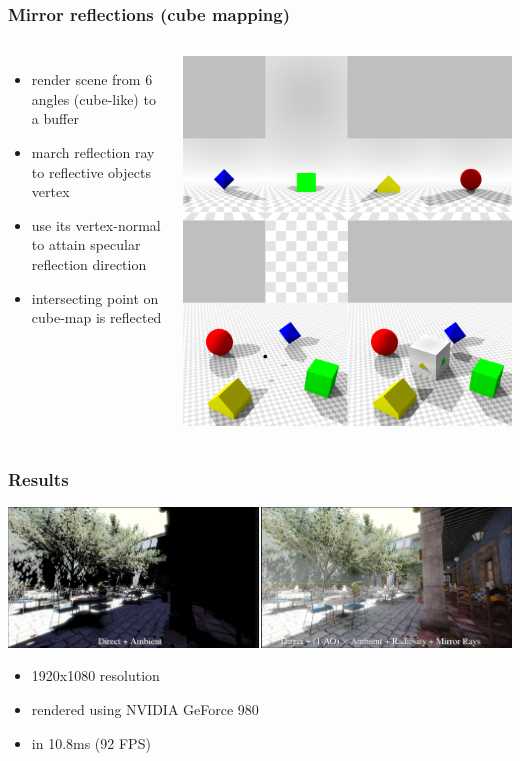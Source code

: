 \documentclass[aspectratio=169]{beamer}
\begin{document}
	\begin{frame}
		\frametitle{Mirror reflections (cube mapping)}
		\begin{columns}
				\begin{itemize}
					\item render scene from 6 angles (cube-like) to a buffer
					\item march reflection ray to reflective objects vertex
					\item use its vertex-normal to attain specular reflection direction
					\item intersecting point on cube-map is reflected
				\end{itemize}
				\includegraphics[height=.9\textwidth]{img/cube_map.png}
		\end{columns}
	\end{frame}	

	\begin{frame}
		\frametitle{Results}
		\includegraphics[width=\textwidth]{img/deep_g_buffer_render.png}
		\begin{itemize}
			\item 1920x1080 resolution
			\item rendered using NVIDIA GeForce 980
			\item in 10.8ms (92 FPS)
		\end{itemize}
	\end{frame}
\end{document}
